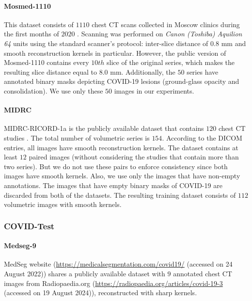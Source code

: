 \paragraph{Mosmed-1110} This dataset consists of $1110$ chest CT scans collected in Moscow clinics during the first months of $2020$ \cite{morozov2020mosmeddata}. Scanning was performed on \textit{Canon (Toshiba) Aquilion 64} units using the standard scanner's protocol: inter-slice distance of $0.8$ mm and smooth reconstruction kernels in particular. However, the public version of Mosmed-1110 contains every $10th$ slice of the original series, which makes the resulting slice distance equal to $8.0$ mm. Additionally, the $50$ series have annotated binary masks depicting COVID-19 lesions (ground-glass opacity and consolidation). We use only these $50$ images in our experiments.


\paragraph{MIDRC} MIDRC-RICORD-1a is the publicly available dataset that contains $120$ chest CT studies \cite{tsai2021rsna}. The total number of volumetric series is $154$. According to the DICOM entries, {all} images have smooth reconstruction kernels. The dataset contains at least $12$ paired images (without considering the studies that contain more than two series). But we do not use these pairs to enforce consistency since both images have smooth kernels. Also, we use only the images that have non-empty annotations. The images that have empty binary masks of COVID-19 are discarded from both of the datasets. The resulting training dataset consists of $112$ volumetric images with smooth kernels.


\subsubsection{COVID-Test}

\paragraph{Medseg-9} MedSeg website ({\url{https://medicalsegmentation.com/covid19/}} (accessed on 24 August 2022)) shares a publicly available dataset with $9$ annotated chest CT images from {Radiopaedia.org} ({\url{https://radiopaedia.org/articles/covid-19-3}} (accessed on 19 August 2024)), reconstructed with sharp kernels.%


